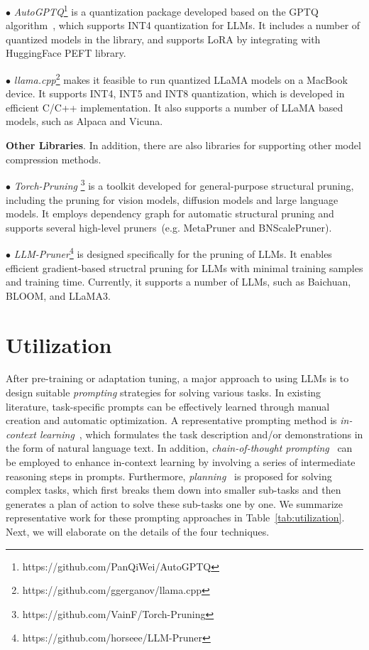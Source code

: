 {{{$\bullet$ \emph{AutoGPTQ}\footnote{https://github.com/PanQiWei/AutoGPTQ} is a quantization package developed based on the GPTQ algorithm~\cite{frantar-arxiv-2022-gptq}, which supports INT4 quantization for LLMs. It includes a number of quantized models in the library, and supports  LoRA by integrating with HuggingFace PEFT library. 

$\bullet$ \emph{llama.cpp}\footnote{https://github.com/ggerganov/llama.cpp} makes it feasible to run  quantized LLaMA models on a MacBook device. It supports INT4, INT5 and INT8 quantization, which is developed in efficient C/C++ implementation. It also supports a number of LLaMA based models, such as Alpaca and  Vicuna. 

\textbf{Other Libraries}. In addition, there are also libraries for supporting other model compression methods. 

$\bullet$ \emph{Torch-Pruning
}\footnote{https://github.com/VainF/Torch-Pruning} is a toolkit developed for general-purpose structural pruning, including the pruning for vision models, diffusion models and large language models. {It employs dependency graph for automatic structural pruning and supports several high-level pruners~(e.g. MetaPruner and BNScalePruner). } 

$\bullet$ \emph{LLM-Pruner}\footnote{https://github.com/horseee/LLM-Pruner} is designed specifically for the pruning of LLMs.  {It enables efficient gradient-based structral pruning for LLMs with minimal training samples and training time. Currently, it supports a number of LLMs, such as Baichuan, BLOOM, and LLaMA3.} 

\section{Utilization}
\label{sec-utilization}

After pre-training or adaptation tuning, a major approach to using LLMs is to design suitable \textit{prompting} strategies for solving various tasks. {In existing literature, task-specific prompts can be effectively learned through manual creation and automatic optimization.} {A representative prompting method is \textit{in-context learning}~\cite{Brown-NeurIPS-2020-Language, Dong-arxiv-2023-A}, which formulates the task description and/or demonstrations in the form of natural language text.} In addition, \textit{chain-of-thought prompting}~\cite{Wei-arxiv-2022-chain} can be employed to enhance in-context learning by involving a series of intermediate reasoning steps in prompts. Furthermore, \textit{planning}~\cite{Zhou-arxiv-2022-Least} is proposed for solving complex tasks, which first breaks them down into smaller sub-tasks and then generates a plan of action to solve these sub-tasks one by one. We summarize representative work for these prompting approaches in Table~\ref{tab:utilization}.
Next, we will elaborate on the details of the four techniques.

}}}
